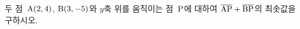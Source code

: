 두 점~$\mathrm{A}(2{,}\mkern3mu\mathopen{}4)$, $\mathrm{B}(3{,}\mkern3mu\mathopen{}-5)$와 $y$축 위를 움직이는 점~$\mathrm{P}$에 대하여 $\overline{\mathrm{AP}}+\overline{\mathrm{BP}}$의 최솟값을 구하시오.
